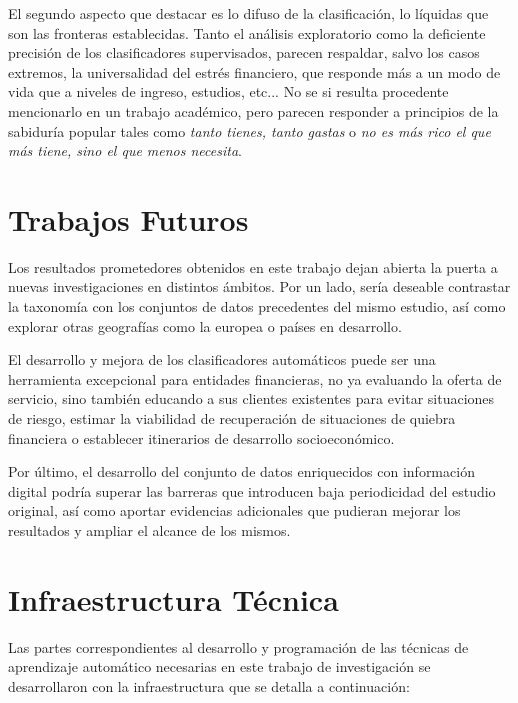 \documentclass[a4paper, 11pt]{article}
\begin{document}
El segundo aspecto que destacar es lo difuso de la clasificación, lo líquidas que son las 
fronteras establecidas. Tanto el análisis exploratorio como la deficiente precisión de los
clasificadores supervisados, parecen respaldar, salvo los casos extremos, la universalidad 
del estrés financiero, que responde más a un modo de vida que a niveles de ingreso, 
estudios, etc... No se si resulta procedente mencionarlo en un trabajo académico, pero
parecen responder a principios de la sabiduría popular tales como \textit{tanto tienes,
tanto gastas} o \textit{no es más rico el que más tiene, sino el que menos necesita}.

\section{Trabajos Futuros}
\label{sec:next_steps}
Los resultados prometedores obtenidos en este trabajo dejan abierta la puerta a 
nuevas investigaciones en distintos ámbitos. Por un lado, sería deseable contrastar
la taxonomía con los conjuntos de datos precedentes del mismo estudio, así como 
explorar otras geografías como la europea o países en desarrollo.

El desarrollo y mejora de los clasificadores automáticos puede ser una herramienta
excepcional para entidades financieras, no ya evaluando la oferta de servicio, sino
también educando a sus clientes existentes para evitar situaciones de riesgo, estimar
la viabilidad de recuperación de situaciones de quiebra financiera o establecer 
itinerarios de desarrollo socioeconómico. 

Por último, el desarrollo del conjunto de datos enriquecidos con información digital 
podría superar las barreras que introducen baja periodicidad del estudio original, así
como aportar evidencias adicionales que pudieran mejorar los resultados y ampliar el
alcance de los mismos.

\clearpage
\printbibliography 
\clearpage
\appendix
\section{Infraestructura Técnica}
\label{sec:infrastructure}
Las partes correspondientes al desarrollo y programación de las técnicas
de aprendizaje automático necesarias en este trabajo de investigación se
desarrollaron con la infraestructura que se detalla a continuación:
\end{document}
